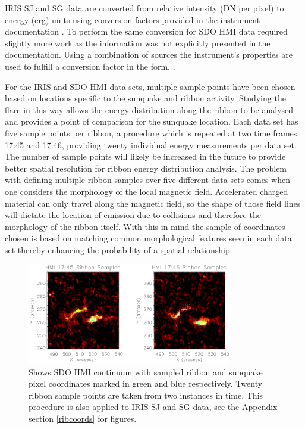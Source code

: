 IRIS SJ and SG data are converted from relative intensity (DN per pixel) to energy (erg) units using conversion factors provided in the instrument documentation \citep{}. To perform the same conversion for SDO HMI data required slightly more work as the information was not explicitly presented in the documentation. Using a combination of sources \citep{} the instrument's properties are used to fulfill a conversion factor in the form, $ $.

For the IRIS and SDO HMI data sets, multiple sample points have been chosen based on locations specific to the sunquake and ribbon activity. Studying the flare in this way allows the energy distribution along the ribbon to be analysed and provides a point of comparison for the sunquake location. Each data set has five sample points per ribbon, a procedure which is repeated at two time frames, 17:45 and 17:46, providing twenty individual energy measurements per data set. The number of sample points will likely be increased in the future to provide better spatial resolution for ribbon energy distribution analysis. The problem with defining multiple ribbon samples over five different data sets comes when one considers the morphology of the local magnetic field. Accelerated charged material can only travel along the magnetic field, so the shape of those field lines will dictate the location of emission due to collisions and therefore the morphology of the ribbon itself. With this in mind the sample of coordinates chosen is based on matching common morphological features seen in each data set thereby enhancing the probability of a spatial relationship.


\begin{figure}%
  \begin{center}
  \includegraphics[width=0.8\textwidth]{29-Mar-14-HMI-Ribbon-Coord-oplot}
  \end{center}
  \caption{Shows SDO HMI continuum with sampled ribbon and sunquake pixel coordinates marked in green and blue respectively. Twenty ribbon sample points are taken from two instances in time. This procedure is also applied to IRIS SJ and SG data, see the Appendix section \ref{ribcoords} for figures.}\label{hmirib}
\end{figure}


